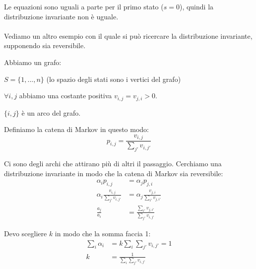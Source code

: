 \documentclass[a4paper,12pt]{book}
\newcommand\ddfrac[2]{\frac{\displaystyle #1}{\displaystyle #2}}
\begin{document}
Le equazioni sono uguali a parte per il primo stato ($ s=0 $), quindi la distribuzione invariante non è uguale. 
\\
\\
Vediamo un altro esempio con il quale si può ricercare la distribuzione invariante, supponendo sia reversibile. 

Abbiamo un grafo:
\begin{multicols}{2}
	
	
	$ S = \{1,...,n\} $ (lo spazio degli stati sono i vertici del grafo)
	
	$ \forall i,j $ abbiamo una costante positiva $ v_{i,j} = v_{j,i} > 0 $.
	
	$ \{i,j\} $ è un arco del grafo.
\end{multicols}

Definiamo la catena di Markov in questo modo:
$$ p_{i,j} = \ddfrac{v_{i,j}}{\sum_{j'}v_{i,j'}} $$

Ci sono degli archi che attirano più di altri il passaggio. Cerchiamo una distribuzione invariante in modo che la catena di Markov sia reversibile:
\begin{align*}
	\alpha_{i}p_{i,j} & = \alpha_{j}p_{j,i} \\
	\alpha_{i}\ddfrac{v_{i,j}}{\sum_{j'}v_{i,j'}} & = 	\alpha_{j}\ddfrac{v_{j,i}}{\sum_{i'}v_{j,i'}} \\
	\ddfrac{a_j}{a_i} & = \frac{\sum_{i'}v_{j,i'}}{\sum_{j'}v_{i,j'}}
\end{align*}

Devo scegliere $ k $ in modo che la somma faccia 1:
\begin{align*}
	\sum_{i}\alpha_{i} & = k\sum_{i}\sum_{j'}v_{i,j'} = 1 \\
	k & = \ddfrac{1}{\sum_{i}\sum_{j'}v_{i,j'}}
\end{align*}
\end{document}
